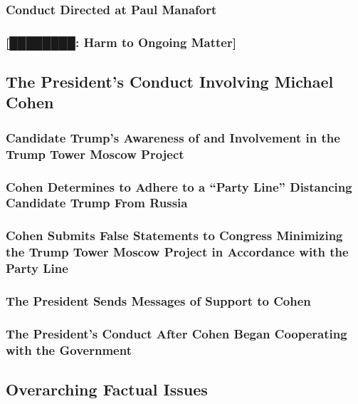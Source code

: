 \subsubsection{Conduct Directed at Paul Manafort}

\subsubsection{[████████: Harm to Ongoing Matter]}

\subsection{The President’s Conduct Involving Michael Cohen}

\subsubsection{Candidate Trump’s Awareness of and Involvement in the Trump Tower Moscow Project}

\subsubsection{Cohen Determines to Adhere to a “Party Line” Distancing Candidate Trump From Russia}

\subsubsection{Cohen Submits False Statements to Congress Minimizing the Trump Tower Moscow Project in Accordance with the Party Line}

\subsubsection{The President Sends Messages of Support to Cohen}

\subsubsection{The President’s Conduct After Cohen Began Cooperating with the Government}

\subsection{Overarching Factual Issues}
